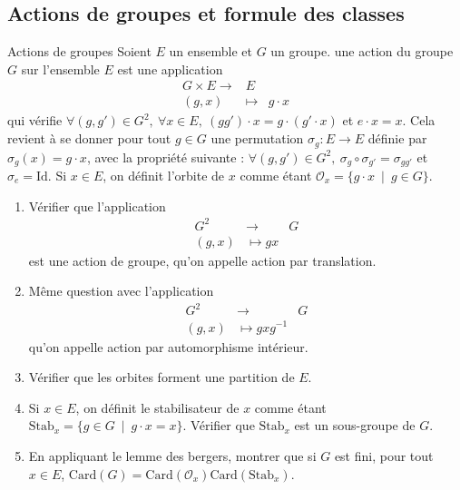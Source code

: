 \documentclass[french,a4paper]{article}
\newcommand{\inv}{^{-1}}
\newcommand{\card}{\text{Card}}
\theoremstyle{plain}
\theoremstyle{definition}
\theoremstyle{remark}
\begin{document}
\subsection{Actions de groupes et formule des classes}
\begin{ex}{Actions de groupes}
	Soient $E$ un ensemble et $G$ un groupe. une action du groupe $G$ sur l'ensemble $E$ est une application $$\begin{array}{rcl}
		G\times E\longrightarrow&E \\
		(g,x)&\longmapsto&g\cdot x
	\end{array}$$ qui vérifie $\forall (g,g')\in G^2,\ \forall x\in E,\ (gg')\cdot x=g\cdot(g'\cdot x)$ et $e\cdot x=x$. Cela revient à se donner pour tout $g\in G$ une permutation $\sigma_g:E\to E$ définie par $\sigma_g(x)=g\cdot x$, avec la propriété suivante : $\forall (g,g')\in G^2,\ \sigma_g\circ\sigma_{g'}=\sigma_{gg'}$ et $\sigma_e=\text{Id}$. Si $x\in E$, on définit l'orbite de $x$ comme étant $\mathcal{O}_x=\{g\cdot x\ \mid \ g\in G\}$.
	\begin{enumerate}
		\item Vérifier que l'application $$\begin{array}{rcl}
			G^2&\longrightarrow&G\\
			(g,x)&\longmapsto gx
		\end{array}$$ est une action de groupe, qu'on appelle action par translation.
		\item Même question avec l'application $$\begin{array}{rcl}
			G^2&\longrightarrow&G\\
			(g,x)&\longmapsto gxg\inv
		\end{array}$$ qu'on appelle action par automorphisme intérieur.
		\item Vérifier que les orbites forment une partition de $E$.
		\item Si $x\in E$, on définit le stabilisateur de $x$ comme étant $\text{Stab}_x=\{g\in G\ \mid \ g\cdot x=x\}$. Vérifier que $\text{Stab}_x$ est un sous-groupe de $G$.
		\item En appliquant le lemme des bergers, montrer que si $G$ est fini, pour tout $x\in E$, $\card(G)=\card(\mathcal{O}_x)\card(\text{Stab}_x)$.
	\end{enumerate}
\end{ex}
\end{document}
